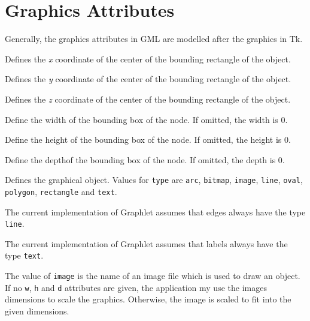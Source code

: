%
%

\section{Graphics Attributes}
\label{s:GML:GraphicsAttributes}

Generally, the graphics attributes in GML are modelled after the
graphics in Tk.


\begin{GMLAttributes}
  
   Defines the \emph{x} coordinate
  of the center of the bounding rectangle of the object.
  
   Defines the \emph{y} coordinate
  of the center of the bounding rectangle of the object.
  
   Defines the \emph{z}
  coordinate\NYI{} of the center of the bounding rectangle of
  the object.
 
   Define the width of the bounding
  box of the node. If omitted, the width is 0.

   Define the height of the bounding
  box of the node. If omitted, the height is 0.
  
   Define the depth\NYI[foot] of
  the bounding box of the node. If omitted, the depth is 0.

  
   Defines the graphical object.
  Values for \texttt{type} are \texttt{arc}, \texttt{bitmap},
  \texttt{image}, \texttt{line}, \texttt{oval}, \texttt{polygon},
  \texttt{rectangle} and \texttt{text}.

  \begin{notes}
    \item The current implementation of Graphlet assumes that
    edges always have the type \texttt{line}.
    \item The current implementation of Graphlet assumes that
    labels always have the type \texttt{text}.
  \end{notes}


   The value of \texttt{image} is
  the name of an image file which is used to draw an object.  If
  no \texttt{w}, \texttt{h} and \texttt{d} attributes are given,
  the application my use the images dimensions to scale the
  graphics.  Otherwise, the image is scaled to fit into the given
  dimensions.


\end{GMLAttributes}

